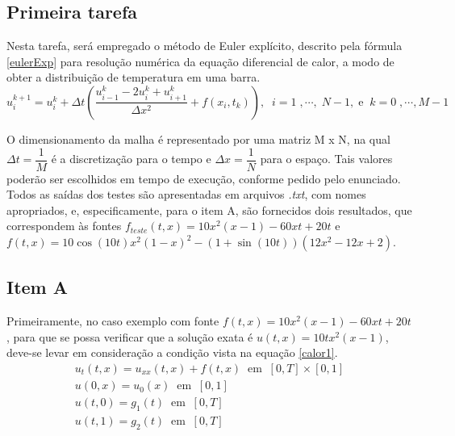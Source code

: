 \documentclass[12pt]{article}
\begin{document}
\tableofcontents 
\clearpage
\begin{spacing}{1.5}

\section{Primeira tarefa}

Nesta tarefa, será empregado o método de Euler explícito, descrito pela fórmula \eqref{eulerExp} para resolução numérica da equação diferencial de calor, a modo de obter a distribuição de temperatura em uma barra.
\label{eulerExp}\begin{equation}
u_{i}^{k+1} = u_{i}^{k} + \Delta t (\frac{u_{i-1}^{k} - 2u_{i}^{k}+ u_{i+1}^{k}}{\Delta x^2}  +f(x_{i},t_{k})) , \;\; i = 1\;,\cdots ,\; N - 1, \;\text{e} \;\; k = 0\;, \cdots , M - 1\;
\end{equation}

O dimensionamento da malha é representado por uma matriz M x N, na qual $\Delta t = \dfrac{1}{M}$ \;é a discretização para o tempo e $\Delta x = \dfrac{1}{N}$ para o espaço. Tais valores poderão ser escolhidos em tempo de execução, conforme pedido pelo enunciado. Todos as saídas dos testes são apresentadas em arquivos \textit{.txt}, com nomes apropriados, e, especificamente, para o item A, são fornecidos dois resultados, que correspondem às fontes $f_{teste}(t,x)=10x^{2}(x-1)-60xt+20t$ e $f(t,x)=10\cos(10t)x^{2}(1-x)^{2}-(1+\sin(10t))(12x^{2}-12x+2)$.


\subsection{Item A}

Primeiramente, no caso exemplo com fonte $f(t,x)=10x^{2} (x-1)-60xt+20t$, para que se possa verificar que a solução exata é $u(t,x)=10tx^{2}(x-1)$, deve-se levar em consideração a condição vista na equação \eqref{calor1}.
\begin{gather}
u_{t}(t,x) = u_{xx}(t,x) + f(t,x) \;\; \text{em} \;\; [0,T]\times[0,1] \label{calor1}\\
u(0,x)=u_0(x) \;\;\text{em}\;\; [0,1] \label{calor2}\\
u(t,0)=g_1(t) \;\;\text{em}\;\; [0,T] \label{calor3}\\
u(t,1)=g_2(t) \;\;\text{em}\;\; [0,T] \label{calor4}
\end{gather}


\end{spacing}
\end{document}
